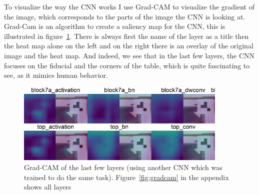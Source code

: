 To visualize the way the CNN works I use Grad-CAM\autocite{Selvaraju_2019} to visualize the gradient of the image, which corresponds to the parts of the image the CNN is looking at.
Grad-Cam is an algorithm to create a saliency map for the CNN, this is illustrated in figure~\ref{fig:gradcam_combined_image}.
There is always first the name of the layer as a title then the heat map alone on the left and on the right there is an overlay of the original image and the heat map.
And indeed, we see that in the last few layers, the CNN focuses on the fiducial and the corners of the table, which is quite fascinating to see, as it mimics human behavior.
\begin{figure}[H]
    \centering
    \includegraphics[width=0.9\textwidth]{../photos/gradcam_combined_image_cropped}
    \caption[cnn-gradcam]{Grad-CAM of the last few layers (using another CNN which was trained to do the same task). Figure~\ref{fig:gradcam} in the appendix shows all layers}
    \label{fig:gradcam_combined_image}
\end{figure}\\



